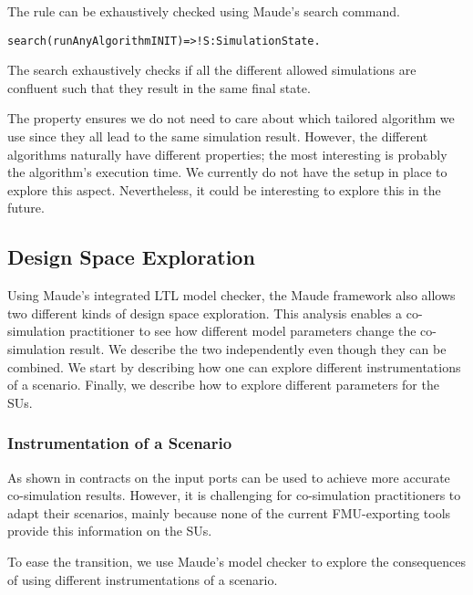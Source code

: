 The rule can be exhaustively checked using Maude's search command.



\begin{alltt}
  search (runAnyAlgorithm INIT)  =>! S:SimulationState . 
\end{alltt}

The search exhaustively checks if all the different allowed simulations are confluent such that they result in the same final state.

The property ensures we do not need to care about which tailored algorithm we use since they all lead to the same simulation result.
However, the different algorithms naturally have different properties; the most interesting is probably the algorithm's execution time. 
We currently do not have the setup in place to explore this aspect.
Nevertheless, it could be interesting to explore this in the future.


\subsection{Design Space Exploration}
Using Maude's integrated LTL model checker, the Maude framework also allows two different kinds of design space exploration.
This analysis enables a co-simulation practitioner to see how different model parameters change the co-simulation result.
We describe the two independently even though they can be combined.
We start by describing how one can explore different instrumentations of a scenario.
Finally, we describe how to explore different parameters for the SUs.  

\subsubsection{Instrumentation of a Scenario}
As shown in \cite{Gomes2019,Oakes2021,hansen_verification_2021} contracts on the input ports can be used to achieve more accurate co-simulation results.
However, it is challenging for co-simulation practitioners to adapt their scenarios, mainly because none of the current FMU-exporting tools provide this information on the SUs.

To ease the transition, we use Maude's model checker to explore the consequences of using different instrumentations of a scenario.

